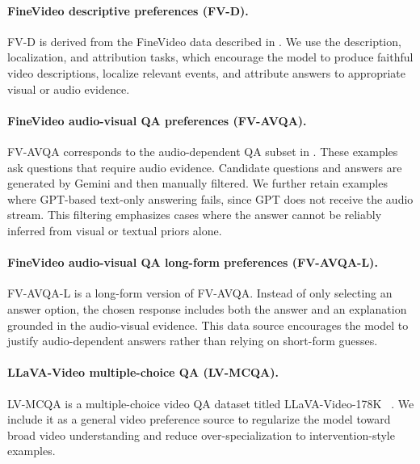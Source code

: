 \documentclass{llmxive}
\begin{document}
\paragraph{FineVideo descriptive preferences (FV-D).}
FV-D is derived from the FineVideo data described in . We use the description, localization, and attribution tasks, which encourage the model to produce faithful video descriptions, localize relevant events, and attribute answers to appropriate visual or audio evidence.

\paragraph{FineVideo audio-visual QA preferences (FV-AVQA).}
FV-AVQA corresponds to the audio-dependent QA subset in . These examples ask questions that require audio evidence. Candidate questions and answers are generated by Gemini and then manually filtered. We further retain examples where GPT-based text-only answering fails, since GPT does not receive the audio stream. This filtering emphasizes cases where the answer cannot be reliably inferred from visual or textual priors alone.

\paragraph{FineVideo audio-visual QA long-form preferences (FV-AVQA-L).}
FV-AVQA-L is a long-form version of FV-AVQA. Instead of only selecting an answer option, the chosen response includes both the answer and an explanation grounded in the audio-visual evidence. This data source encourages the model to justify audio-dependent answers rather than relying on short-form guesses.

\paragraph{LLaVA-Video multiple-choice QA (LV-MCQA).}
LV-MCQA is a multiple-choice video QA dataset titled LLaVA-Video-178K ~\cite{zhang2024videoinstructiontuningsynthetic}. We include it as a general video preference source to regularize the model toward broad video understanding and reduce over-specialization to intervention-style examples.
\end{document}
